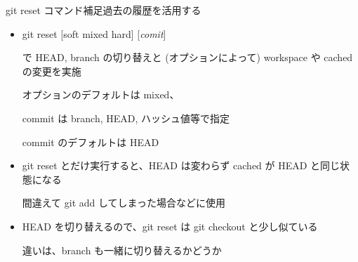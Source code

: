 \begin{frame}[t]{git reset コマンド補足}{過去の履歴を活用する}

  \begin{itemize}
  \item git reset [{\dhyphen}soft {\vbar} {\dhyphen}mixed {\vbar} {\dhyphen}hard] [\textit{comit}]

    で HEAD, branch の切り替えと (オプションによって) workspace や cached の変更を実施

    オプションのデフォルトは {\dhyphen}mixed、

    commit は branch, HEAD, ハッシュ値等で指定

    commit のデフォルトは HEAD
    \vspace{2ex}

  \item git reset とだけ実行すると、HEAD は変わらず cached が HEAD と同じ状態になる

    間違えて git add してしまった場合などに使用
    \vspace{2ex}

  \item HEAD を切り替えるので、git reset は git checkout と少し似ている

    違いは、branch も一緒に切り替えるかどうか
  \end{itemize}

\end{frame}
